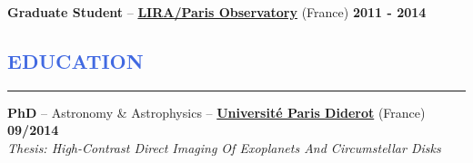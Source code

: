 \documentclass[11pt]{article}
\begin{document}
\vspace{-0.3cm}
\textbf{Graduate Student} --
\href{http://www.obspm.fr/?lang=en}{\textbf{LIRA/Paris Observatory}} (France)
\hfill        { \bf 2011 - 2014}\\




%


\vspace{-0.35cm}
\textcolor{RoyalBlue}{\section{\large EDUCATION}
\vspace{-0.35cm}\hrule}
\vspace{0.4cm}

\textbf{PhD} -- Astronomy \& Astrophysics --
\href{https://www.univ-paris-diderot.fr/}{\textbf{Universit\'e Paris Diderot}} (France)
\hfill  { \bf 09/2014}\\
{\small \it Thesis: High-Contrast Direct Imaging Of Exoplanets And Circumstellar Disks}\\
\end{document}
